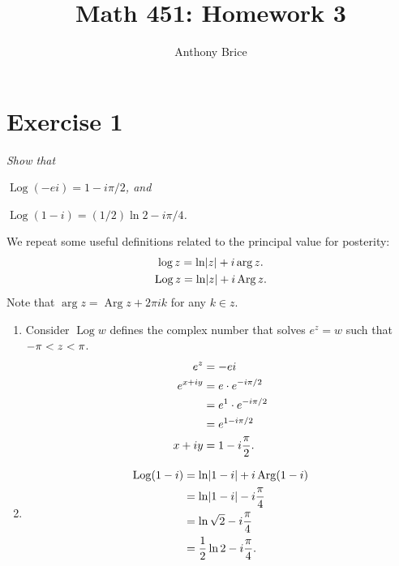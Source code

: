 \documentclass{tufte-handout}
\title{Math 451: Homework 3}
\author{Anthony Brice}
\DeclareMathOperator{\Log}{Log}
\DeclareMathOperator{\Arg}{Arg}
\let\Im\relax
\DeclareMathOperator{\Im}{Im}
\DeclarePairedDelimiter\abs{\lvert}{\rvert}%
\begin{document}
\maketitle

\section{Exercise 1}

\emph{Show that}
\begin{enumerate*}[label=\emph{(\alph*)}]
\item \emph{$\Log (-ei) = 1 - i \pi / 2$, and}
\item \emph{$\Log(1 - i) = (1/2) \ln 2 - i \pi / 4$.}
\end{enumerate*}

\bigskip

We repeat some useful definitions related to the principal
value\footnotemark{} for posterity: 
\begin{gather*}
\log z = \ln \abs{z} + i \arg z.\\
\Log z = \ln\abs{z} + i \Arg z.
\end{gather*}
Note that $\arg z = \Arg z + 2 \pi i k$ for any $k \in z$.

\begin{enumerate}[label=(\alph*)]
\item
Consider $\Log w$ defines the complex number that solves $e^z = w$
such that $-\pi < \Im z < \pi$.
\begin{align*}
  e^z &= -ei\\
  e^{x + iy} &= e \cdot e^{-i \pi / 2}\\
      &= e^1 \cdot e^{-i \pi / 2}\\
      &= e^{1 - i \pi / 2}\\
  x + i y &= 1 - i {\pi \over 2}.
\end{align*}

\item
\begin{align*}
  \Log(1 - i) &= \ln\abs{1 - i} + i \Arg(1 - i)\\
              &= \ln\abs{1 - i} - i {\pi \over 4}\\
              &= \ln \sqrt{2} - i {\pi \over 4}\\
              &= {1 \over 2} \ln 2 - i {\pi \over 4}.
\end{align*}
\end{enumerate}
\end{document}
